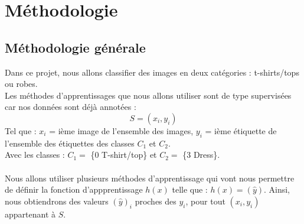 \documentclass[a4paper,10pt]{article}
\begin{document}
\newpage
\section{Méthodologie}
	\subsection{Méthodologie générale}
		Dans ce projet, nous allons classifier des images en deux catégories : t-shirts/tops ou robes.\\
		Les méthodes d'apprentissages que nous allons utiliser sont de type supervisées car nos données sont déjà annotées :
		$$ S = {(x_i, y_i)} $$
		Tel que : $x_i$ = ième image de l'ensemble des images, $y_i$ = ième étiquette de l'ensemble des étiquettes des classes $C_1$ et $C_2$.\\
		Avec les classes : $C_1 =$ \{0 T-shirt/top\} et $C_2 =$ \{3 Dress\}.\\
		\\
		Nous allons utiliser plusieurs méthodes d’apprentissage qui vont nous permettre de définir la fonction d'appprentissage $h(x)$ telle que : $h(x) = (\hat y)$. Ainsi, nous obtiendrons des valeurs $(\hat y)_i$ proches des $y_i$, pour tout $(x_i, y_i)$ appartenant à $S$.\\
\end{document}
